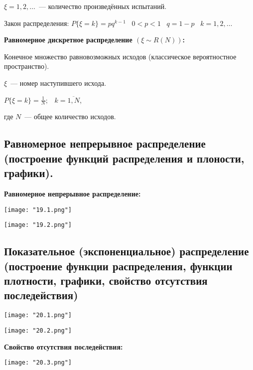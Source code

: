     $\xi = 1, 2, \dots$~--- количество произведённых испытаний.
    \smallskip

    Закон распределения: $P\{\xi = k\} = p q^{k - 1} \;\;\; 0 < p < 1 \;\;\;
    q = 1 - p \;\;\; k = 1, 2, \dots$
    \bigskip

\textbf{Равномерное дискретное распределение $(\xi \sim R(N))$:}
    \smallskip
    
    Конечное множество равновозможных исходов (классическое вероятностное
    пространство).
    \smallskip

    $\xi$~--- номер наступившего исхода.
    \smallskip

    $P\{\xi = k\} = \frac{1}{N}; \;\;\; k = \overline{1, N}$,

    где $N$~--- общее количество исходов.

\subsection{Равномерное непрерывное распределение (построение функций 
распределения и плоности, графики).}

\textbf{Равномерное непрерывное распределение:}
    \smallskip

    \begin{center}
        \texttt{[image: "19.1.png"]}
        \bigskip

        \texttt{[image: "19.2.png"]}
        \bigskip
    \end{center}
\subsection{Показательное (экспоненциальное) распределение (построение функции
распределения, функции плотности, графики, свойство отсутствия последействия)}

\begin{center}
    \texttt{[image: "20.1.png"]}
    \bigskip

    \texttt{[image: "20.2.png"]}
    \bigskip
\end{center}

\textbf{Свойство отсутствия последействия:}
    \smallskip 

    \begin{center}
        \texttt{[image: "20.3.png"]}
    \end{center}



